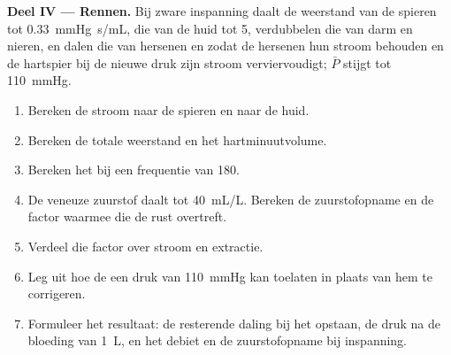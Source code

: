 \begin{problem}
\medskip
\noindent\textbf{Deel IV --- Rennen.}
Bij zware inspanning daalt de weerstand van de spieren tot
\qty{0.33}{mmHg.s/mL}, die van de huid tot 5, verdubbelen die van darm en
nieren, en dalen die van hersenen en  zodat de hersenen hun stroom
behouden en de hartspier bij de nieuwe druk zijn stroom verviervoudigt;
$\bar P$ stijgt tot \qty{110}{mmHg}.
\begin{enumerate}[resume]
  \item Bereken de stroom naar de spieren en naar de huid.
  \item Bereken de totale weerstand en het hartminuutvolume.
  \item Bereken het  bij een frequentie van 180.
  \item De veneuze zuurstof daalt tot \qty{40}{mL/L}. Bereken de
        zuurstofopname en de factor waarmee die de rust overtreft.
  \item Verdeel die factor over stroom en extractie.
  \item Leg uit hoe de  een druk van \qty{110}{mmHg} kan toelaten
        in plaats van hem te corrigeren.
  \item Formuleer het resultaat: de resterende daling bij het opstaan, de
        druk na de bloeding van \qty{1}{L}, en het debiet en de
        zuurstofopname bij inspanning.
\end{enumerate}
\end{problem}
